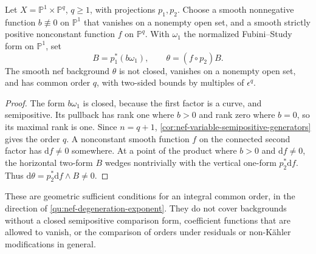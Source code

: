 \begin{example}\label{ex:nef-open-zero-rank-background}
Let $X=\mathbb P^1\times\mathbb P^q$, $q\geq1$, with projections $p_1,p_2$. Choose a smooth nonnegative function $b\not\equiv0$ on $\mathbb P^1$ that vanishes on a nonempty open set, and a smooth strictly positive nonconstant function $f$ on $\mathbb P^q$. With $\omega_1$ the normalized Fubini--Study form on $\mathbb P^1$, set
\[
 B=p_1^*(b\omega_1),\qquad \theta=(f\circ p_2)B.
\]
The smooth nef background $\theta$ is not closed, vanishes on a nonempty open set, and has common order $q$, with two-sided bounds by multiples of $\epsilon^q$.
\end{example}
\begin{proof}
The form $b\omega_1$ is closed, because the first factor is a curve, and semipositive. Its pullback has rank one where $b>0$ and rank zero where $b=0$, so its maximal rank is one. Since $n=q+1$, \cref{cor:nef-variable-semipositive-generators} gives the order $q$. A nonconstant smooth function $f$ on the connected second factor has $\mathrm df\ne0$ somewhere. At a point of the product where $b>0$ and $\mathrm df\neq0$, the horizontal two-form $B$ wedges nontrivially with the vertical one-form $p_2^*\mathrm df$. Thus $\mathrm d\theta=p_2^*\mathrm df\wedge B\ne0$.
\end{proof}

These are geometric sufficient conditions for an integral common order, in the direction of \cref{qu:nef-degeneration-exponent}. They do not cover backgrounds without a closed semipositive comparison form, coefficient functions that are allowed to vanish, or the comparison of orders under residuals or non-K\"ahler modifications in general.
